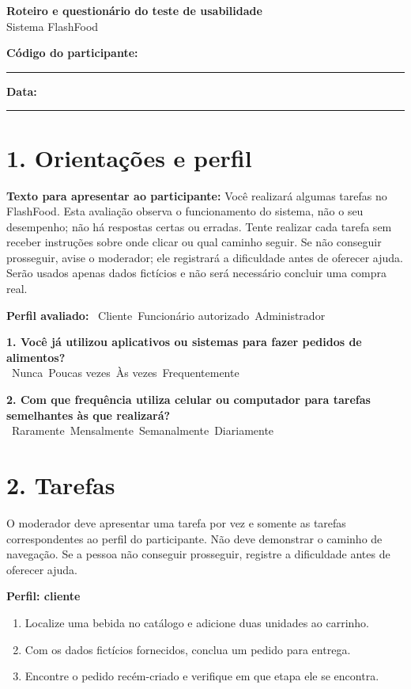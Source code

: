 \documentclass[12pt,a4paper]{article}
\newcommand{\caixa}{\fbox{\rule{0pt}{1.1ex}\rule{1.1ex}{0pt}}}
\begin{document}
\begin{center}
  {\Large\textbf{Roteiro e questionário do teste de usabilidade}}\\[2mm]
  {\large Sistema FlashFood}
\end{center}

\textbf{Código do participante:} \rule{3cm}{0.4pt}\hfill
\textbf{Data:} \rule{3cm}{0.4pt}

\section*{1. Orientações e perfil}

\textbf{Texto para apresentar ao participante:} Você realizará algumas tarefas no FlashFood. Esta avaliação observa o funcionamento do sistema, não o seu desempenho; não há respostas certas ou erradas. Tente realizar cada tarefa sem receber instruções sobre onde clicar ou qual caminho seguir. Se não conseguir prosseguir, avise o moderador; ele registrará a dificuldade antes de oferecer ajuda. Serão usados apenas dados fictícios e não será necessário concluir uma compra real.

\textbf{Perfil avaliado:} \caixa\ Cliente\quad \caixa\ Funcionário autorizado\quad \caixa\ Administrador

\textbf{1. Você já utilizou aplicativos ou sistemas para fazer pedidos de alimentos?}\\
\caixa\ Nunca\quad \caixa\ Poucas vezes\quad \caixa\ Às vezes\quad \caixa\ Frequentemente

\textbf{2. Com que frequência utiliza celular ou computador para tarefas semelhantes às que realizará?}\\
\caixa\ Raramente\quad \caixa\ Mensalmente\quad \caixa\ Semanalmente\quad \caixa\ Diariamente

\section*{2. Tarefas}

O moderador deve apresentar uma tarefa por vez e somente as tarefas correspondentes ao perfil do participante. Não deve demonstrar o caminho de navegação. Se a pessoa não conseguir prosseguir, registre a dificuldade antes de oferecer ajuda.

\textbf{Perfil: cliente}
\begin{enumerate}[label=U0\arabic*,leftmargin=1.4cm]
  \item Localize uma bebida no catálogo e adicione duas unidades ao carrinho.
  \item Com os dados fictícios fornecidos, conclua um pedido para entrega.
  \item Encontre o pedido recém-criado e verifique em que etapa ele se encontra.
\end{enumerate}
\end{document}
